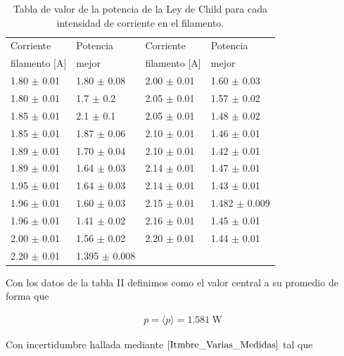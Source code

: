 \documentclass[%
 reprint,
 amsmath,amssymb,
 aps,
]{revtex4-2}
\begin{document}
\begin{table}[H]
    \centering
    \begin{tabular}{l|l||l|l}
        \toprule
        \toprule
            Corriente  & Potencia  & Corriente  & Potencia \\
            filamento [A] & mejor& filamento [A] & mejor\\
        \midrule
         1.80 $\pm$ 0.01  &  1.80  $\pm$ 0.08 & 2.00 $\pm$ 0.01  &  1.60  $\pm$  0.03\\
         1.80 $\pm$ 0.01  &  1.7  $\pm$  0.2 & 2.05 $\pm$ 0.01  &  1.57  $\pm$  0.02\\
         1.85 $\pm$ 0.01  &  2.1  $\pm$  0.1 & 2.05 $\pm$ 0.01  &  1.48  $\pm$  0.02\\
         1.85 $\pm$ 0.01  &  1.87  $\pm$  0.06 & 2.10 $\pm$ 0.01  &  1.46  $\pm$  0.01\\
         1.89 $\pm$ 0.01  &  1.70  $\pm$  0.04 & 2.10 $\pm$ 0.01  &  1.42  $\pm$  0.01\\
         1.89 $\pm$ 0.01  &  1.64  $\pm$  0.03 &  2.14 $\pm$ 0.01  &  1.47  $\pm$  0.01\\
         1.95 $\pm$ 0.01  &  1.64  $\pm$  0.03 & 2.14 $\pm$ 0.01  &  1.43  $\pm$  0.01\\
         1.96 $\pm$ 0.01  &  1.60  $\pm$  0.03 & 2.15 $\pm$ 0.01  &  1.482  $\pm$  0.009\\
         1.96 $\pm$ 0.01  &  1.41  $\pm$  0.02 & 2.16 $\pm$ 0.01  &  1.45  $\pm$  0.01\\
         2.00 $\pm$ 0.01  &  1.56  $\pm$  0.02 & 2.20 $\pm$ 0.01  &  1.44  $\pm$  0.01 \\
        2.20 $\pm$ 0.01  &  1.395  $\pm$  0.008 & & \\
    \bottomrule
    \bottomrule
    \end{tabular}
    \caption{Tabla de valor de la potencia de la Ley de Child para cada intensidad de corriente en el filamento.}
    \label{tab: Potencias Ley de Child}
\end{table}

Con los datos de la tabla II definimos como el valor central a su promedio de forma que

\begin{align*}
    p=\langle p\rangle=1.581\ \text{W}
\end{align*}

\vspace{0.2 cm}
Con incertidumbre hallada mediante $\ref{Itmbre_Varias_Medidas}$ tal que
\end{document}

